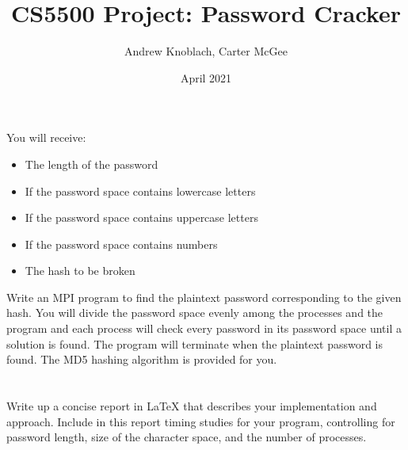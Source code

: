 \documentclass{article}
\title{CS5500 Project: Password Cracker}
\author{Andrew Knoblach, Carter McGee}
\date{April 2021}
\begin{document}
\maketitle

\section{} You will receive:

\begin{itemize}
	\item The length of the password
	\item If the password space contains lowercase letters
	\item If the password space contains uppercase letters
	\item If the password space contains numbers
	\item The hash to be broken
\end{itemize}

Write an MPI program to find the plaintext password corresponding to the given hash. You will divide the password space evenly among the processes and the program and each process will check every password in its password space until a solution is found. The program will terminate when the plaintext password is found. The MD5 hashing algorithm is provided for you.

\section{} Write up a concise report in LaTeX that describes your implementation and approach. Include in this report timing studies for your program, controlling for password length, size of the character space, and the number of processes.
\end{document}
